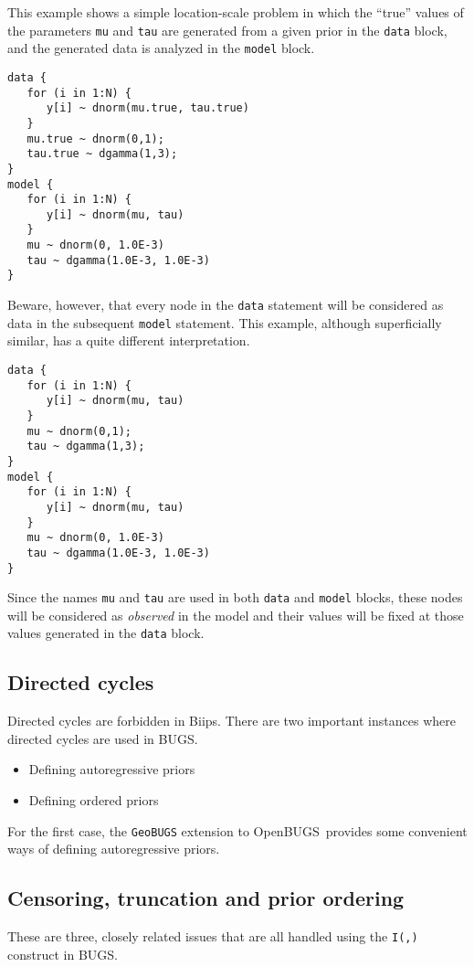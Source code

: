 \documentclass[11pt, a4paper, titlepage]{report}
\newcommand{\biips}{\textsf{Biips}}
\newcommand{\BUGS}{\textsf{BUGS}}
\newcommand{\OpenBUGS}{\textsf{OpenBUGS}}
\begin{document}
This example shows a simple location-scale problem in which the ``true''
values of the parameters \texttt{mu} and \texttt{tau} are generated
from a given prior in the \texttt{data} block, and the generated
data is analyzed in the \texttt{model} block.
\begin{verbatim}
data {
   for (i in 1:N) {
      y[i] ~ dnorm(mu.true, tau.true) 
   }
   mu.true ~ dnorm(0,1);
   tau.true ~ dgamma(1,3);
}
model {
   for (i in 1:N) {
      y[i] ~ dnorm(mu, tau)
   }
   mu ~ dnorm(0, 1.0E-3)
   tau ~ dgamma(1.0E-3, 1.0E-3)
}
\end{verbatim}
Beware, however, that every node in the \texttt{data} statement will
be considered as data in the subsequent \texttt{model} statement. This
example, although superficially similar, has a quite different interpretation.
\begin{verbatim}
data {
   for (i in 1:N) {
      y[i] ~ dnorm(mu, tau) 
   }
   mu ~ dnorm(0,1);
   tau ~ dgamma(1,3);
}
model {
   for (i in 1:N) {
      y[i] ~ dnorm(mu, tau)
   }
   mu ~ dnorm(0, 1.0E-3)
   tau ~ dgamma(1.0E-3, 1.0E-3)
}
\end{verbatim}
Since the names \texttt{mu} and \texttt{tau} are used in both
\texttt{data} and \texttt{model} blocks, these nodes will be
considered as {\em observed} in the model and their values will be
fixed at those values generated in the \texttt{data} block.

\subsection{Directed cycles}

Directed cycles are forbidden in \biips. There are two important
instances where directed cycles are used in \BUGS.
\begin{itemize}
\item Defining autoregressive priors
\item Defining ordered priors
\end{itemize}
For the first case, the \texttt{GeoBUGS} extension to \OpenBUGS\ provides
some convenient ways of defining autoregressive priors.

\subsection{Censoring, truncation and prior ordering}
\label{section:censoring}

These are three, closely related issues that are all handled using
the \texttt{I(,)} construct in \BUGS.
\end{document}
